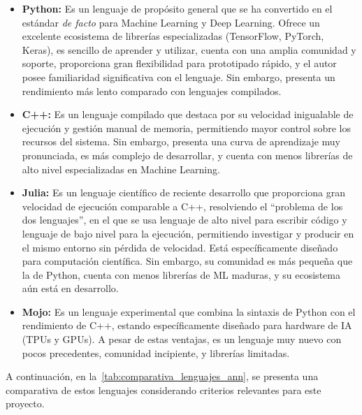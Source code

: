 \begin{itemize}
    \item \textbf{Python:} Es un lenguaje de propósito general que se ha convertido en el estándar \textit{de facto} para Machine Learning y Deep Learning. Ofrece un excelente ecosistema de librerías especializadas (TensorFlow, PyTorch, Keras), es sencillo de aprender y utilizar, cuenta con una amplia comunidad y soporte, proporciona gran flexibilidad para prototipado rápido, y el autor posee familiaridad significativa con el lenguaje. Sin embargo, presenta un rendimiento más lento comparado con lenguajes compilados.
    
    \item \textbf{C++:} Es un lenguaje compilado que destaca por su velocidad inigualable de ejecución y gestión manual de memoria, permitiendo mayor control sobre los recursos del sistema. Sin embargo, presenta una curva de aprendizaje muy pronunciada, es más complejo de desarrollar, y cuenta con menos librerías de alto nivel especializadas en Machine Learning.
    
    \item \textbf{Julia:} Es un lenguaje científico de reciente desarrollo que proporciona gran velocidad de ejecución comparable a C++, resolviendo el ``problema de los dos lenguajes'', en el que se usa lenguaje de alto nivel para escribir código y lenguaje de bajo nivel para la ejecución, permitiendo investigar y producir en el mismo entorno sin pérdida de velocidad. Está específicamente diseñado para computación científica. Sin embargo, su comunidad es más pequeña que la de Python, cuenta con menos librerías de ML maduras, y su ecosistema aún está en desarrollo.
    
    \item \textbf{Mojo:} Es un lenguaje experimental que combina la sintaxis de Python con el rendimiento de C++, estando específicamente diseñado para hardware de IA (TPUs y GPUs). A pesar de estas ventajas, es un lenguaje muy nuevo con pocos precedentes, comunidad incipiente, y librerías limitadas.
\end{itemize}

A continuación, en la~\autoref{tab:comparativa_lenguajes_ann}, se presenta una comparativa de estos lenguajes considerando criterios relevantes para este proyecto.

